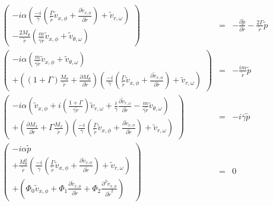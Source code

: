 \documentclass[12pt]{article}
\begin{document}
\begin{eqnarray}
\left(
\begin{array}{r}
-i \alpha 
\left(
\frac{-i}{ \overline{\gamma}}
\left(
\frac{\Gamma}{\widetilde{r}}
\widetilde{v}_{x,\phi}
+
\frac{\partial \widetilde{v}_{x,\phi}}{\partial \widetilde{r}} 
\right)
+\widetilde{v}_{r,\omega} 
\right)
\\
-\frac{2 M_{\theta}}{\widetilde{r}} 
\left(
\frac{m}{\overline{\gamma} \widetilde{r}} \widetilde{v}_{x,\phi}
+\widetilde{v}_{\theta,\omega} 
\right)
\end{array}
\right)
&=&
-
\frac{\partial \widetilde{p} }{\partial \widetilde{r}} 
-
\frac{2 \Gamma}{\widetilde{r}} \widetilde{p}
\nonumber
\\
\left(
\begin{array}{r}
-i
\alpha
\left(
\frac{m}{\overline{\gamma} \widetilde{r}} \widetilde{v}_{x,\phi}
+\widetilde{v}_{\theta,\omega} 
\right)
\\
+
\left(
\left(1 + \Gamma \right)
\frac{M_{\theta} }{\widetilde{r}}
+
\frac{\partial M_{\theta} }{\partial \widetilde{r}}
\right) 
\left(
\frac{-i}{ \overline{\gamma}}
\left(
\frac{\Gamma}{\widetilde{r}}
\widetilde{v}_{x,\phi}
+
\frac{\partial \widetilde{v}_{x,\phi}}{\partial \widetilde{r}} 
\right)
+\widetilde{v}_{r,\omega} 
\right)
\end{array}
\right)
&=&
-\frac{i m }{\widetilde{r} } \widetilde{p}
\nonumber
\\
\left(
\begin{array}{r}
-i
\alpha
\left(
\widetilde{v}_{x,\phi} 
+
i
\left(
\frac{ 1 + \Gamma}{\overline{\gamma} \widetilde{r}}
\right)
 \widetilde{v}_{r,\omega}
+ 
\frac{i}{\overline{\gamma}}
\frac{\partial \widetilde{v}_{r,\omega}}{\partial \widetilde{r}}
- \frac{m}{\overline{\gamma} \widetilde{r}} \widetilde{v}_{\theta,\omega}
\right)
\\
+
\left(
\frac{\partial M_x }{\partial \widetilde{r}} 
+
\Gamma \frac{M_x }{\widetilde{r}}
\right)
\left(
\frac{-i}{ \overline{\gamma}}
\left(
\frac{\Gamma}{\widetilde{r}}
\widetilde{v}_{x,\phi}
+
\frac{\partial \widetilde{v}_{x,\phi}}{\partial \widetilde{r}} 
\right)
+\widetilde{v}_{r,\omega} 
\right)
\end{array}
\right)
&=&
-i \overline{\gamma} \widetilde{p}
\nonumber
\\
\left(
\begin{array}{r}
-i
\alpha
 \widetilde{p}
\\
+
\frac{M_{\theta}^2}{\widetilde{r}}
\left(
\frac{-i}{ \overline{\gamma}}
\left(
\frac{\Gamma}{\widetilde{r}}
\widetilde{v}_{x,\phi}
+
\frac{\partial \widetilde{v}_{x,\phi}}{\partial \widetilde{r}} 
\right)
+\widetilde{v}_{r,\omega} 
\right)
\\
+ 
\left(
\Phi_0 
\widetilde{v}_{x,\phi}
+\Phi_1 
\frac{\partial
\widetilde{v}_{x,\phi}
}{\partial \widetilde{r}} 
+\Phi_2 
\frac{\partial^2
\widetilde{v}_{x,\phi}
}{\partial \widetilde{r}^2} 
\right)
\end{array}
\right)
&=&
0
\nonumber
\end{eqnarray}
\end{document}
